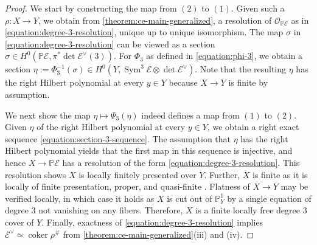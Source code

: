 \documentclass[12 pt]{amsart}
\newcommand{\rboxed}[1]{#1}
\theoremstyle{plain}
\theoremstyle{definition}
\theoremstyle{remark}
\numberwithin{equation}{section}
\newcommand\bp{\mathbb P}
\newcommand\sce{\mathscr E}
\newcommand\sco{\mathscr O}
\newcommand \ra{\rightarrow}
\DeclareMathOperator\spec{\operatorname{Spec}}
\DeclareMathOperator\coker{coker}
\DeclareMathOperator\sym{Sym}
\begin{document}
\begin{proof} 
	We start by constructing the map from $(2)$ to $(1)$.
	Given such a $\rho: X \ra Y$, we obtain from
	\autoref{theorem:ce-main-generalized}, a resolution of
	$\sco_{\bp\sce}$ as in \eqref{equation:degree-3-resolution}, unique up
	to unique isomorphism.  The map $\sigma$ in
	\eqref{equation:degree-3-resolution} 
	can be viewed as a section $\sigma \in H^0(\bp \sce, \pi^* \det
	\sce^\vee(3))$.
	For $\Phi_3$ as defined in \eqref{equation:phi-3}, we obtain a section $\rboxed{\eta }:=
	\Phi_3^{-1}(\sigma) \in H^0(Y, \sym^3 \sce \otimes \det \sce^{\vee})$.
	Note that the resulting $\eta$ has the right Hilbert polynomial at every $y \in
	Y$ because $X \ra Y$ is finite by assumption.

	We next show the map $\eta \mapsto \Psi_3(\eta)$ indeed defines a map
	from $(1)$ to $(2)$.
	Given $\eta$ of the right Hilbert polynomial at every $y \in Y$,
	we obtain a right exact sequence \eqref{equation:section-3-sequence}.
	The assumption that $\eta$ has the right Hilbert polynomial yields that
	the first map in this sequence is injective, and hence $X \to \bp \sce$
	has a resolution of the form \eqref{equation:degree-3-resolution}.
	This resolution shows $X$ is locally finitely presented over $Y$.  Further,
	$X$ is finite as it is locally of finite presentation, proper, and
	quasi-finite \cite[8.11.1]{EGAIV.3}.  Flatness of $X \to Y$ may be
	verified locally, in which case it holds as $X$ is cut out of $\bp^1_Y$
	by a single equation of degree $3$ not vanishing on any fibers.
	Therefore, $X$ is a finite locally free degree $3$ cover of $Y$.
	Finally, exactness of \eqref{equation:degree-3-resolution} implies
	$\sce^\vee \simeq \coker \rho^\#$ from
	\autoref{theorem:ce-main-generalized}(iii) and (iv).


\end{proof}
\end{document}
